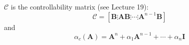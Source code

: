 $\mathcal{C}$ is the controllability matrix (see Lecture 19):
\[
\mathcal{C} = [\mathbf{B}\vdots\mathbf{AB}\vdots\cdots\vdots\mathbf{A}^{n-1}\mathbf{B}]
\]
and
\[
\alpha_c(\mathbf{A})=\mathbf{A}^n + \alpha_1\mathbf{A}^{n-1}+ \cdots + \alpha_n\mathbf{I}
\]

\endinput

